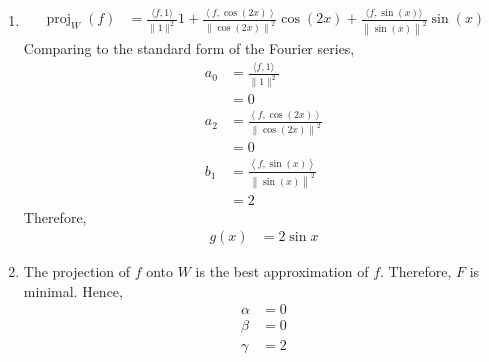\documentclass[fleqn, a4paper, 12pt, twoside]{article}
\theoremstyle{definition}
\theoremstyle{theorem}
\DeclareMathOperator{\proj}{proj}
\begin{document}
\begin{solution}
	\begin{enumerate}[leftmargin=*]
		\item
			\begin{align*}
				\proj_{W}(f) & = \frac{\langle f,1 \rangle}{\|1\|^2} 1 + \frac{\left\langle f,\cos(2 x) \right\rangle}{\left\| \cos(2 x) \right\|^2} \cos(2 x) + \frac{\langle f,\sin(x) \rangle}{\left\| \sin(x) \right\|^2} \sin(x)
			\end{align*}
			Comparing to the standard form of the Fourier series,
			\begin{align*}
				a_0 & = \frac{\langle f,1 \rangle}{\|1\|^2}                                         \\
                                    & = 0                                                                           \\
				a_2 & = \frac{\left\langle f,\cos(2 x) \right\rangle}{\left\| \cos(2 x) \right\|^2} \\
                                    & = 0                                                                           \\
				b_1 & = \frac{\left\langle f,\sin(x) \right\rangle}{\left\| \sin(x) \right\|^2}     \\
                                    & = 2
			\end{align*}
			Therefore,
			\begin{align*}
				g(x) & = 2 \sin x
			\end{align*}
		\item
			The projection of $f$ onto $W$ is the best approximation of $f$.
			Therefore, $F$ is minimal.
			Hence,
			\begin{align*}
				\alpha & = 0 \\
				\beta  & = 0 \\
				\gamma & = 2
			\end{align*}
	\end{enumerate}
\end{solution}
\end{document}

